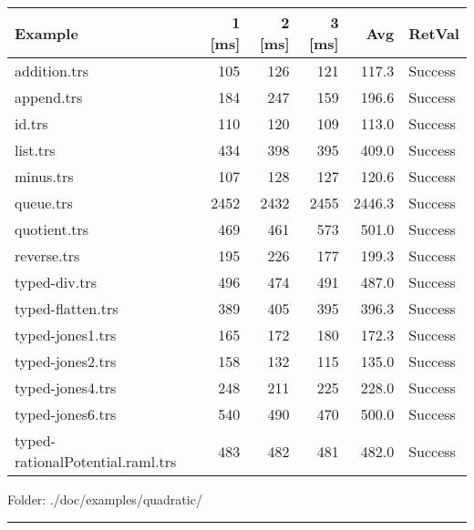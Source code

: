 \documentclass[11pt]{article}
\begin{document}
\begin{center}
\begin{tabular}{lrrrrl}
\hline
Example & 1 [ms] & 2 [ms] & 3 [ms] & Avg & RetVal\\
\hline
addition.trs & 105 & 126 & 121 & 117.3 & Success\\
append.trs & 184 & 247 & 159 & 196.6 & Success\\
id.trs & 110 & 120 & 109 & 113.0 & Success\\
list.trs & 434 & 398 & 395 & 409.0 & Success\\
minus.trs & 107 & 128 & 127 & 120.6 & Success\\
queue.trs & 2452 & 2432 & 2455 & 2446.3 & Success\\
quotient.trs & 469 & 461 & 573 & 501.0 & Success\\
reverse.trs & 195 & 226 & 177 & 199.3 & Success\\
typed-div.trs & 496 & 474 & 491 & 487.0 & Success\\
typed-flatten.trs & 389 & 405 & 395 & 396.3 & Success\\
typed-jones1.trs & 165 & 172 & 180 & 172.3 & Success\\
typed-jones2.trs & 158 & 132 & 115 & 135.0 & Success\\
typed-jones4.trs & 248 & 211 & 225 & 228.0 & Success\\
typed-jones6.trs & 540 & 490 & 470 & 500.0 & Success\\
typed-rationalPotential.raml.trs & 483 & 482 & 481 & 482.0 & Success\\
\hline
\end{tabular}

\end{center}

Folder: ./doc/examples/quadratic/

\rule{\linewidth}{0.5pt}
\end{document}
